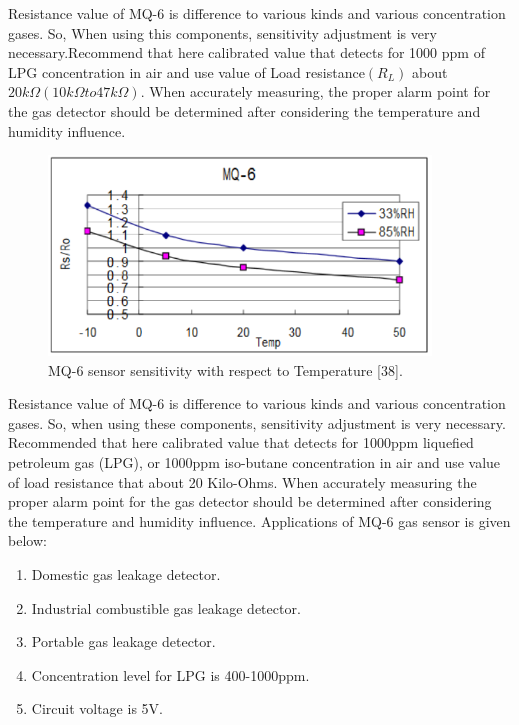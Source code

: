 Resistance value of MQ-6 is difference to various kinds and various concentration gases. So, When using this components, sensitivity adjustment is very necessary.Recommend that here calibrated value that detects for 1000 ppm of LPG concentration in air and use value of Load resistance$(R_L)$ about $20 k\Omega (10 k\Omega to 47 k\Omega)$. When accurately measuring, the proper alarm point for the gas detector should be determined after considering the temperature and humidity influence.

\begin{figure}[h]
  \centering
  \includegraphics[width=4in]{7}
  \vspace{-.1in}
  \caption{MQ-6 sensor sensitivity with respect to Temperature [38].}\label{fig7}
\end{figure}
Resistance value of MQ-6 is difference to various kinds and various concentration gases. So, when using these components, sensitivity adjustment is very necessary. Recommended that here calibrated value that detects for 1000ppm liquefied petroleum gas (LPG), or 1000ppm iso-butane concentration in air and use value of load resistance that about 20 Kilo-Ohms. When accurately measuring the proper alarm point for the gas detector should be determined after considering the temperature and humidity influence. Applications of MQ-6 gas sensor is given below:
\begin{enumerate}
  \item	Domestic gas leakage detector.
  \item	Industrial combustible gas leakage detector.
  \item	Portable gas leakage detector.
  \item	Concentration level for LPG is 400-1000ppm.
  \item	Circuit voltage is 5V.

\end{enumerate}
